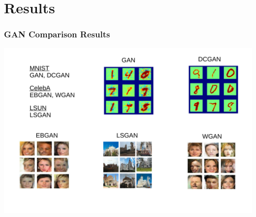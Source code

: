 \documentclass{beamer}
\begin{document}



\section*{Results}
\begin{frame}
\frametitle{\textbf{GAN Comparison Results}}
\centering
\includegraphics[width= \linewidth]{11.pdf}
\end{frame}
\end{document}
